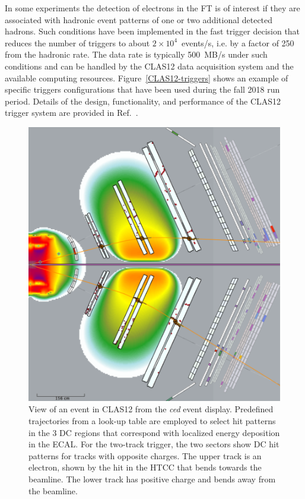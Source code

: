 \documentclass[final,3p]{elsarticle}
\begin{document}
\begin{twocolumn}
In some experiments the detection of electrons in the FT is of interest if they are associated with hadronic event
patterns of one or two additional detected hadrons. Such conditions have been implemented in the fast trigger decision
that reduces the number of triggers to about $2 \times 10^4$~events/s, i.e. by  a factor of 250 from the hadronic
rate. The data rate is typically 500~MB/s under such conditions and can be handled by the CLAS12 data acquisition
system and the available computing resources. Figure~\ref{CLAS12-triggers} shows an example of specific triggers
configurations that have been used during the fall 2018 run period. Details of the design, functionality, and performance
of the CLAS12 trigger system are provided in Ref.~\cite{TRIG}. 

\begin{figure}[th!]
\centerline{\includegraphics[width=0.95\columnwidth]{trigger.png}}
\caption{View of an event in CLAS12 from the {\it ced} event display. Predefined trajectories from a look-up
  table are employed to select hit patterns in the 3 DC regions that correspond with localized energy deposition
  in the ECAL. For the two-track trigger, the two sectors show DC hit patterns for tracks with opposite charges.
  The upper track is an electron, shown by the hit in the HTCC that bends towards the beamline. The lower track
  has positive charge and bends away from the beamline.}
\label{trigger}
\end{figure}


\end{twocolumn}
\end{document}
